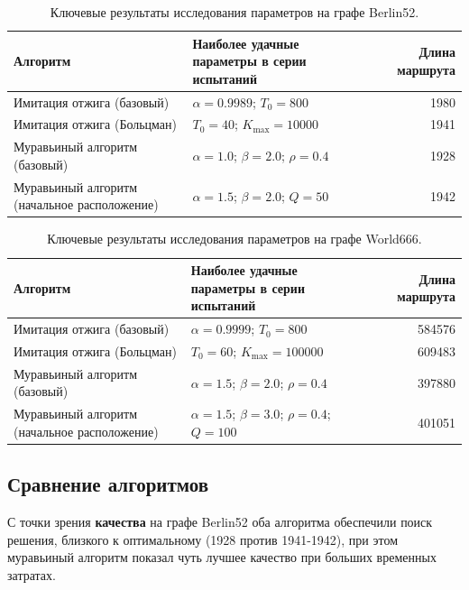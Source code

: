 \documentclass[12pt,a4paper]{article}
\begin{document}
\begin{table}[H]
    \centering
    \caption{Ключевые результаты исследования параметров на графе Berlin52.}
    \begin{tabularx}{\textwidth}{p{3.6cm}Xr}
        \toprule
        Алгоритм & Наиболее удачные параметры в серии испытаний & Длина маршрута \\
        \midrule
        Имитация отжига (базовый) & $\alpha = 0.9989$; $T_0 = 800$ & 1980 \\
        Имитация отжига (Больцман) & $T_0 = 40$; $K_{\max} = 10000$ & 1941 \\
        Муравьиный алгоритм (базовый) & $\alpha = 1.0$; $\beta = 2.0$; $\rho = 0.4$ & 1928 \\
        Муравьиный алгоритм (начальное расположение) & $\alpha = 1.5$; $\beta = 2.0$; $Q = 50$ & 1942 \\
        \bottomrule
    \end{tabularx}
\end{table}

\begin{table}[H]
    \centering
    \caption{Ключевые результаты исследования параметров на графе World666.}
    \begin{tabularx}{\textwidth}{p{3.6cm}Xr}
        \toprule
        Алгоритм & Наиболее удачные параметры в серии испытаний & Длина маршрута \\
        \midrule
        Имитация отжига (базовый) & $\alpha = 0.9999$; $T_0 = 800$ & 584576 \\
        Имитация отжига (Больцман) & $T_0 = 60$; $K_{\max} = 100000$ & 609483 \\
        Муравьиный алгоритм (базовый) & $\alpha = 1.5$; $\beta = 2.0$; $\rho = 0.4$ & 397880 \\
        Муравьиный алгоритм (начальное расположение) & $\alpha = 1.5$; $\beta = 3.0$; $\rho = 0.4$; $Q = 100$ & 401051 \\
        \bottomrule
    \end{tabularx}
\end{table}

\subsection{Сравнение алгоритмов}

С точки зрения \textbf{качества} на графе Berlin52 оба алгоритма обеспечили
поиск решения, близкого к оптимальному (1928 против 1941-1942), при этом
муравьиный алгоритм показал чуть лучшее качество при больших временных затратах.
\end{document}
